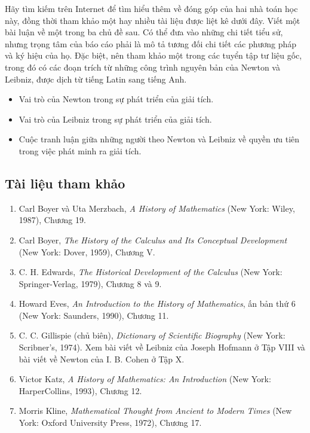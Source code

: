 \documentclass[12pt,a4paper]{article}
\begin{document}
Hãy tìm kiếm trên Internet để tìm hiểu thêm về đóng góp của hai nhà toán học này, đồng thời tham khảo một hay nhiều tài liệu được liệt kê dưới đây. Viết một bài luận về một trong ba chủ đề sau. Có thể đưa vào những chi tiết tiểu sử, nhưng trọng tâm của báo cáo phải là mô tả tương đối chi tiết các phương pháp và ký hiệu của họ. Đặc biệt, nên tham khảo một trong các tuyển tập tư liệu gốc, trong đó có các đoạn trích từ những công trình nguyên bản của Newton và Leibniz, được dịch từ tiếng Latin sang tiếng Anh.
\begin{itemize}[leftmargin=1.5em]
\item Vai trò của Newton trong sự phát triển của giải tích.
\item Vai trò của Leibniz trong sự phát triển của giải tích.
\item Cuộc tranh luận giữa những người theo Newton và Leibniz về quyền ưu tiên trong việc phát minh ra giải tích.
\end{itemize}

\subsection*{Tài liệu tham khảo}
\begin{enumerate}[leftmargin=1.8em]
\item Carl Boyer và Uta Merzbach, \textit{A History of Mathematics} (New York: Wiley, 1987), Chương 19.
\item Carl Boyer, \textit{The History of the Calculus and Its Conceptual Development} (New York: Dover, 1959), Chương V.
\item C. H. Edwards, \textit{The Historical Development of the Calculus} (New York: Springer-Verlag, 1979), Chương 8 và 9.
\item Howard Eves, \textit{An Introduction to the History of Mathematics}, ấn bản thứ 6 (New York: Saunders, 1990), Chương 11.
\item C. C. Gillispie (chủ biên), \textit{Dictionary of Scientific Biography} (New York: Scribner’s, 1974). Xem bài viết về Leibniz của Joseph Hofmann ở Tập VIII và bài viết về Newton của I. B. Cohen ở Tập X.
\item Victor Katz, \textit{A History of Mathematics: An Introduction} (New York: HarperCollins, 1993), Chương 12.
\item Morris Kline, \textit{Mathematical Thought from Ancient to Modern Times} (New York: Oxford University Press, 1972), Chương 17.
\end{enumerate}
\end{document}
